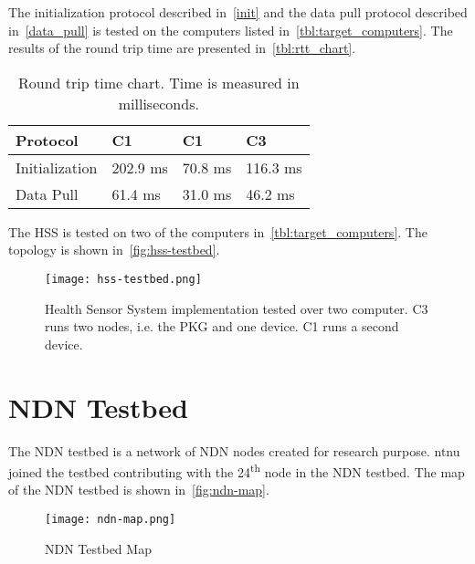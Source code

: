 The initialization protocol described in~\autoref{init} and the data pull protocol described in~\autoref{data_pull} is tested on the computers listed in~\autoref{tbl:target_computers}.
The results of the round trip time are presented in~\autoref{tbl:rtt_chart}.
\begin{table}[h]
  \begin{tabular}[c]{p{}p{}p{}p{}}
  Protocol                                & C1            & C1            & C3            \\ \hline
  Initialization                          & 202.9 ms      & 70.8 ms       & 116.3 ms     \\ %
  Data Pull                               & 61.4 ms       & 31.0 ms       & 46.2 ms     \\ %
  \end{tabular}
  \caption{Round trip time chart. Time is measured in milliseconds.}
  \label{tbl:rtt_chart}
\end{table}

The \gls{HSS} is tested on two of the computers in~\autoref{tbl:target_computers}.
The topology is shown in~\autoref{fig:hss-testbed}.
\begin{figure}[ht]
  \centering
  \texttt{[image: hss-testbed.png]}
  \caption{Health Sensor System implementation tested over two computer. C3 runs two nodes, i.e. the PKG and one device. C1 runs a second device.}
  \label{fig:hss-testbed}
\end{figure}

\section{NDN Testbed}
The \gls{NDN} testbed is a network of \gls{NDN} nodes created for research purpose. 
\gls{ntnu} joined the testbed contributing with the 24\textsuperscript{th} node in the NDN testbed.
The map of the NDN testbed is shown in~\autoref{fig:ndn-map}.

\begin{figure}[ht]
  \centering
  \texttt{[image: ndn-map.png]}
  \caption{NDN Testbed Map}
  \label{fig:ndn-map}
\end{figure}

